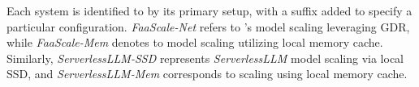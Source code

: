 

Each system is identified to by its primary setup, with a suffix added to specify a particular configuration. 
\textit{FaaScale-Net} refers to \SysName's model scaling leveraging GDR, while \textit{FaaScale-Mem } denotes to model scaling utilizing local memory cache.
Similarly, \textit{ServerlessLLM-SSD} represents \textit{ServerlessLLM} model scaling via local SSD, and \textit{ServerlessLLM-Mem} corresponds to scaling using local memory cache.
\fi 

